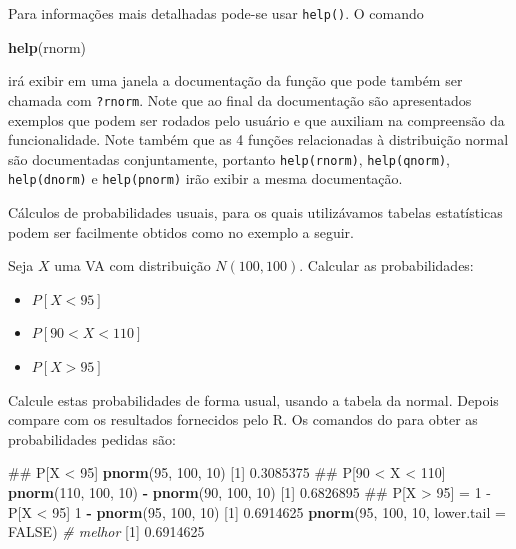 \documentclass[10pt,a4paper]{book}
\newenvironment{Shaded}{\begin{snugshade}}{\end{snugshade}}
\newcommand{\KeywordTok}[1]{\textcolor[rgb]{0.13,0.29,0.53}{\textbf{#1}}}
\newcommand{\DataTypeTok}[1]{\textcolor[rgb]{0.13,0.29,0.53}{#1}}
\newcommand{\DecValTok}[1]{\textcolor[rgb]{0.00,0.00,0.81}{#1}}
\newcommand{\FloatTok}[1]{\textcolor[rgb]{0.00,0.00,0.81}{#1}}
\newcommand{\StringTok}[1]{\textcolor[rgb]{0.31,0.60,0.02}{#1}}
\newcommand{\CommentTok}[1]{\textcolor[rgb]{0.56,0.35,0.01}{\textit{#1}}}
\newcommand{\OtherTok}[1]{\textcolor[rgb]{0.56,0.35,0.01}{#1}}
\newcommand{\OperatorTok}[1]{\textcolor[rgb]{0.81,0.36,0.00}{\textbf{#1}}}
\newcommand{\NormalTok}[1]{#1}
\providecommand{\tightlist}{%
  \setlength{\itemsep}{0pt}\setlength{\parskip}{0pt}}
\begin{document}
Para informações mais detalhadas pode-se usar \texttt{help()}. O comando

\begin{Shaded}
\begin{Highlighting}[]
\KeywordTok{help}\NormalTok{(rnorm)}
\end{Highlighting}
\end{Shaded}

irá exibir em uma janela a documentação da função que pode também ser
chamada com \texttt{?rnorm}. Note que ao final da documentação são
apresentados exemplos que podem ser rodados pelo usuário e que auxiliam
na compreensão da funcionalidade. Note também que as 4 funções
relacionadas à distribuição normal são documentadas conjuntamente,
portanto \texttt{help(rnorm)}, \texttt{help(qnorm)},
\texttt{help(dnorm)} e \texttt{help(pnorm)} irão exibir a mesma
documentação.

Cálculos de probabilidades usuais, para os quais utilizávamos tabelas
estatísticas podem ser facilmente obtidos como no exemplo a seguir.

Seja \(X\) uma VA com distribuição \(N(100, 100)\). Calcular as
probabilidades:

\begin{itemize}
\tightlist
\item
  \(P[X < 95]\)
\item
  \(P[90 < X < 110]\)
\item
  \(P[X > 95]\)
\end{itemize}

Calcule estas probabilidades de forma usual, usando a tabela da normal.
Depois compare com os resultados fornecidos pelo R. Os comandos do para
obter as probabilidades pedidas são:

\begin{Shaded}
\begin{Highlighting}[]
\NormalTok{## P[X < 95]}
\KeywordTok{pnorm}\NormalTok{(}\DecValTok{95}\NormalTok{, }\DecValTok{100}\NormalTok{, }\DecValTok{10}\NormalTok{)}
\NormalTok{[}\DecValTok{1}\NormalTok{] }\FloatTok{0.3085375}
\NormalTok{## P[90 < X < 110]}
\KeywordTok{pnorm}\NormalTok{(}\DecValTok{110}\NormalTok{, }\DecValTok{100}\NormalTok{, }\DecValTok{10}\NormalTok{) }\OperatorTok{-}\StringTok{ }\KeywordTok{pnorm}\NormalTok{(}\DecValTok{90}\NormalTok{, }\DecValTok{100}\NormalTok{, }\DecValTok{10}\NormalTok{)}
\NormalTok{[}\DecValTok{1}\NormalTok{] }\FloatTok{0.6826895}
\NormalTok{## P[X > 95] = 1 - P[X < 95]}
\DecValTok{1} \OperatorTok{-}\StringTok{ }\KeywordTok{pnorm}\NormalTok{(}\DecValTok{95}\NormalTok{, }\DecValTok{100}\NormalTok{, }\DecValTok{10}\NormalTok{)}
\NormalTok{[}\DecValTok{1}\NormalTok{] }\FloatTok{0.6914625}
\KeywordTok{pnorm}\NormalTok{(}\DecValTok{95}\NormalTok{, }\DecValTok{100}\NormalTok{, }\DecValTok{10}\NormalTok{, }\DataTypeTok{lower.tail =} \OtherTok{FALSE}\NormalTok{) }\CommentTok{# melhor}
\NormalTok{[}\DecValTok{1}\NormalTok{] }\FloatTok{0.6914625}
\end{Highlighting}
\end{Shaded}
\end{document}

